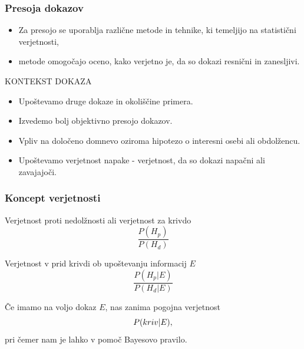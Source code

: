\documentclass{beamer}
\begin{document}
\begin{frame}
    \frametitle{Presoja dokazov}
    \begin{itemize}
        \item Za presojo se uporablja različne metode in tehnike, ki temeljijo na statistični verjetnosti,
        \item metode omogočajo oceno, kako verjetno je, da so dokazi resnični in zanesljivi. 
    \end{itemize}
    \begin{beamerboxesrounded}[]{KONTEKST DOKAZA}
        \begin{itemize}
            \item Upoštevamo druge dokaze in okoliščine primera.
            \item Izvedemo bolj objektivno presojo dokazov.
            \item Vpliv na določeno domnevo oziroma hipotezo o interesni osebi ali obdolžencu.
            \item Upoštevamo verjetnost napake - verjetnost, da so dokazi napačni ali zavajajoči.
        \end{itemize} 
    \end{beamerboxesrounded}
\end{frame}

\begin{frame}
    \frametitle{Koncept verjetnosti}
    \begin{beamerboxesrounded}[]{Verjetnost proti nedolžnosti ali verjetnost za krivdo}
        \[
            \frac{P(H_p)}{P(H_d)}
        \]    
    \end{beamerboxesrounded} \vspace{3mm}
    \begin{beamerboxesrounded}[]{Verjetnost v prid krivdi ob upoštevanju informacij $E$}
        \[
            \frac{P(H_p \lvert E)}{P(H_d \lvert E)} 
        \]    
    \end{beamerboxesrounded} \vspace{5mm}
    Če imamo na voljo dokaz $E$, nas zanima pogojna verjetnost
    \[
        P(kriv \lvert E), \vspace{2mm}
    \]
    pri čemer nam je lahko v pomoč Bayesovo pravilo.
\end{frame}
\end{document}
